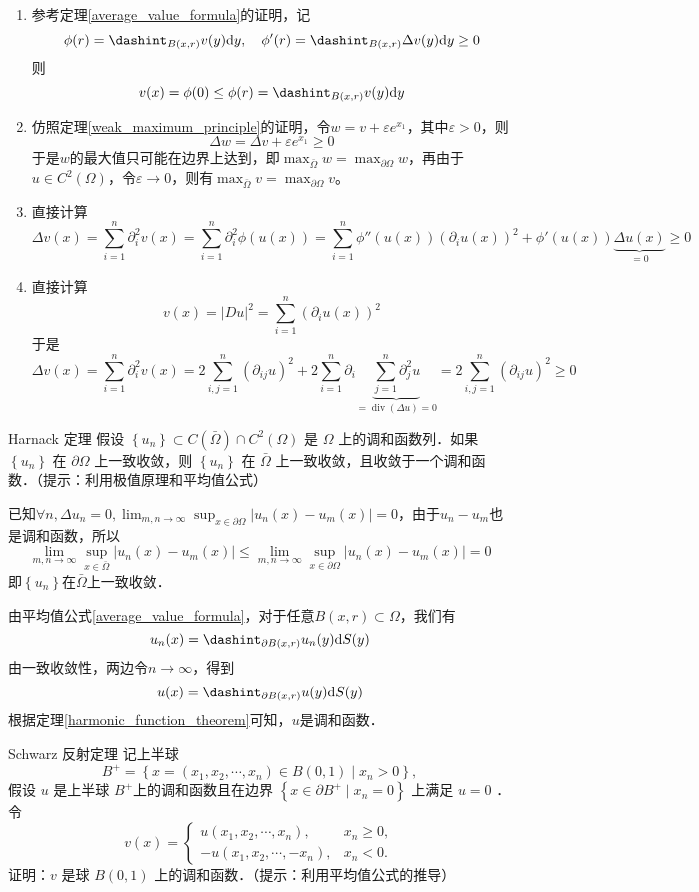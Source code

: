 \documentclass{mynote}
\begin{document}
\begin{enumerate}
    \item 参考定理\ref{average_value_formula}的证明，记
    \[
        \phi(r)=\dashint_{B(x,r)}v(y)\mathrm{d}y,\quad \phi'(r)=\dashint_{B(x,r)}\Delta v(y)\mathrm{d}y\ge 0
    \]
    则
    \[
        v(x)=\phi(0)\le \phi(r)=\dashint_{B(x,r)}v(y)\mathrm{d}y
    \]
    \item 仿照定理\ref{weak_maximum_principle}的证明，令$w=v+\varepsilon e^{x_1}$，其中$\varepsilon>0$，则
    \[
        \Delta w=\Delta v+\varepsilon e^{x_1}\ge 0
    \]
    于是$w$的最大值只可能在边界上达到，即$\max_{\bar{\Omega}}w=\max_{\partial \Omega}w$，再由于$u\in C^2(\Omega)$，令$\varepsilon\to 0$，则有$\max_{\bar{\Omega}}v=\max_{\partial \Omega}v$。
    \item 直接计算
    \[
        \Delta v(x)=\sum_{i=1}^n\partial_{i}^2v(x)=\sum_{i=1}^n\partial_{i}^2\phi(u(x))=\sum_{i=1}^n\phi''(u(x))(\partial_{i}u(x))^2+\phi'(u(x))\underbrace{\Delta u(x)}_{=0}\ge 0
    \]
    \item 直接计算
    \[
        v(x)=|Du|^2=\sum_{i=1}^n\left(\partial_{i}u(x)\right)^2
    \]
    于是
    \[
        \Delta v(x)=\sum_{i=1}^n\partial_{i}^2v(x)=2\sum_{i,j=1}^n(\partial_{ij}u)^2+2\sum_{i=1}^n\partial_i\underbrace{\sum_{j=1}^n\partial_j^2u}_{=\operatorname{div}(\Delta u)=0}=2\sum_{i,j=1}^n(\partial_{ij}u)^2\ge 0
    \]
\end{enumerate}
\begin{exercise}{Harnack 定理}
    假设 $\left\{u_n\right\} \subset C(\bar{\Omega}) \cap C^2(\Omega)$ 是 $\Omega$ 上的调和函数列．如果 $\left\{u_n\right\}$ 在 $\partial \Omega$ 上一致收敛，则 $\left\{u_n\right\}$ 在 $\bar{\Omega}$ 上一致收敛，且收敛于一个调和函数．（提示：利用极值原理和平均值公式）
\end{exercise}
已知$\forall n,\Delta u_n=0,\lim_{m,n\to \infty}\sup_{x\in\partial \Omega}|u_n(x)-u_m(x)|=0$，由于$u_n-u_m$也是调和函数，所以
\[
    \lim_{m,n\to \infty}\sup_{x\in\bar{\Omega}}|u_n(x)-u_m(x)|\le \lim_{m,n\to \infty}\sup_{x\in\partial \Omega}|u_n(x)-u_m(x)|=0
\]
即$\left\{u_n\right\}$在$\bar{\Omega}$上一致收敛．

由平均值公式\ref{average_value_formula}，对于任意$B(x,r)\subset \Omega$，我们有
\[
    u_n(x)=\dashint_{\partial B(x,r)}u_n(y)\mathrm{d}S(y)
\]
由一致收敛性，两边令$n\to \infty$，得到
\[
    u(x)=\dashint_{\partial B(x,r)}u(y)\mathrm{d}S(y)
\]
根据定理\ref{harmonic_function_theorem}可知，$u$是调和函数．

\begin{exercise}{Schwarz 反射定理}
    记上半球
$$
B^{+}=\left\{x=\left(x_1, x_2, \cdots, x_n\right) \in B(0,1) \mid x_n>0\right\},
$$
假设 $u$ 是上半球 $B^{+}$上的调和函数且在边界 $\left\{x \in \partial B^{+} \mid x_n=0\right\}$ 上满足 $u=0$ ．令
$$
v(x)= \begin{cases}u\left(x_1, x_2, \cdots, x_n\right), & x_n \geq 0, \\ -u\left(x_1, x_2, \cdots,-x_n\right), & x_n<0 .\end{cases}
$$
证明：$v$ 是球 $B(0,1)$ 上的调和函数．（提示：利用平均值公式的推导）
\end{exercise}
\end{document}
